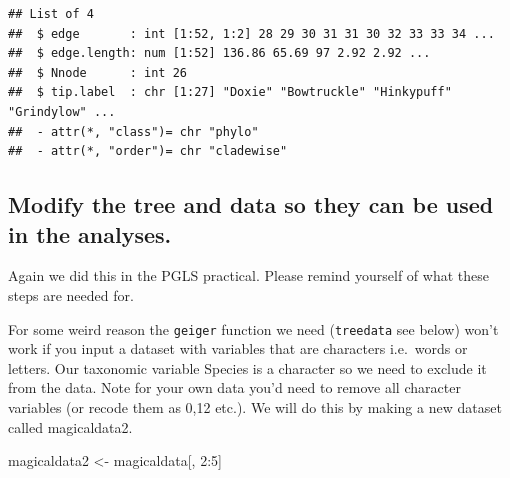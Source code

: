 \documentclass[]{book}
\newenvironment{Shaded}{\begin{snugshade}}{\end{snugshade}}
\newcommand{\KeywordTok}[1]{\textcolor[rgb]{0.13,0.29,0.53}{\textbf{{#1}}}}
\newcommand{\DecValTok}[1]{\textcolor[rgb]{0.00,0.00,0.81}{{#1}}}
\newcommand{\StringTok}[1]{\textcolor[rgb]{0.31,0.60,0.02}{{#1}}}
\newcommand{\CommentTok}[1]{\textcolor[rgb]{0.56,0.35,0.01}{\textit{{#1}}}}
\newcommand{\NormalTok}[1]{{#1}}
\begin{document}
\begin{verbatim}
## List of 4
##  $ edge       : int [1:52, 1:2] 28 29 30 31 31 30 32 33 33 34 ...
##  $ edge.length: num [1:52] 136.86 65.69 97 2.92 2.92 ...
##  $ Nnode      : int 26
##  $ tip.label  : chr [1:27] "Doxie" "Bowtruckle" "Hinkypuff" "Grindylow" ...
##  - attr(*, "class")= chr "phylo"
##  - attr(*, "order")= chr "cladewise"
\end{verbatim}

\subsection{Modify the tree and data so they can be used in the
analyses.}\label{modify-the-tree-and-data-so-they-can-be-used-in-the-analyses.}

Again we did this in the PGLS practical. Please remind yourself of what
these steps are needed for.

\begin{Shaded}
\end{Shaded}

For some weird reason the \texttt{geiger} function we need
(\texttt{treedata} see below) won't work if you input a dataset with
variables that are characters i.e.~words or letters. Our taxonomic
variable Species is a character so we need to exclude it from the data.
Note for your own data you'd need to remove all character variables (or
recode them as 0,12 etc.). We will do this by making a new dataset
called magicaldata2.

\begin{Shaded}
\begin{Highlighting}[]
\NormalTok{magicaldata2 <-}\StringTok{ }\NormalTok{magicaldata[, }\DecValTok{2}\NormalTok{:}\DecValTok{5}\NormalTok{]}
\end{Highlighting}
\end{Shaded}
\end{document}
